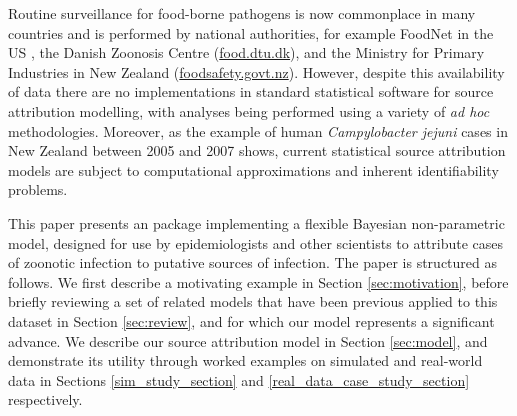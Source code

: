 Routine surveillance for food-borne pathogens is now commonplace in many countries and is performed by national authorities, for example FoodNet in the US \citep{Allos15042004}, the Danish 
Zoonosis Centre (\url{food.dtu.dk}), and the Ministry for Primary Industries in New Zealand (\url{foodsafety.govt.nz}).  However, despite this availability of data there are no implementations in standard statistical software 
 for source attribution modelling, with analyses being performed using a variety of \emph{ad hoc} methodologies.  Moreover, as the example of human \emph{Campylobacter jejuni} 
cases in New Zealand between 2005 and 2007 shows, current statistical source attribution models are subject to computational approximations and inherent identifiability problems.  

This paper presents an  package  implementing a flexible Bayesian non-parametric model, designed for use by epidemiologists and other scientists to attribute cases of 
zoonotic infection to putative sources of infection.  The paper is structured as follows.  We first describe a motivating example in Section \ref{sec:motivation}, before briefly reviewing a set of related 
models that have been previous applied to this dataset in Section \ref{sec:review}, and for which our model represents a significant advance.  We describe our source attribution model in Section \ref{sec:model}, and demonstrate its utility through worked examples on simulated and real-world data in Sections \ref{sim_study_section} and \ref{real_data_case_study_section} respectively. 

